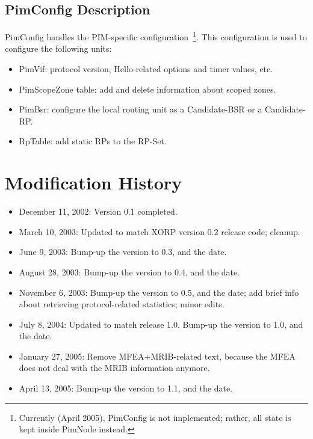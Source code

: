 \documentclass[11pt]{article}
\begin{document}
\subsection{PimConfig Description}

PimConfig handles the PIM-specific configuration~\footnote{Currently
(April 2005), PimConfig is not implemented; rather, all state is
kept inside PimNode instead.}. This configuration is used to configure the
following units:

\begin{itemize}

  \item PimVif: protocol version, Hello-related options and timer
  values, etc.

  \item PimScopeZone table: add and delete information about scoped zones.

  \item PimBsr: configure the local routing unit as a Candidate-BSR or a
  Candidate-RP.

  \item RpTable: add static RPs to the RP-Set.

\end{itemize}


\appendix
\section{Modification History}

\begin{itemize}

  \item December 11, 2002: Version 0.1 completed.

  \item March 10, 2003: Updated to match XORP version 0.2 release code;
  cleanup.

  \item June 9, 2003: Bump-up the version to 0.3, and the date.

  \item August 28, 2003: Bump-up the version to 0.4, and the date.

  \item November 6, 2003: Bump-up the version to 0.5, and the date;
  add brief info about retrieving protocol-related statistics; minor edits.

  \item July 8, 2004: Updated to match release 1.0. Bump-up the version to
  1.0, and the date.

  \item January 27, 2005: Remove MFEA+MRIB-related text, because the MFEA
  does not deal with the MRIB information anymore.

  \item April 13, 2005: Bump-up the version to 1.1, and the date.

\end{itemize}





\end{document}
